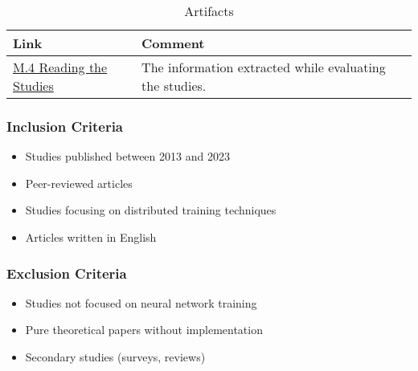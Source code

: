 



\begin{table*}[htbp]
    \centering 
    \caption{Artifacts}
    \label{tab:artefacts}
    \begin{tabularx}{\textwidth}{lXX}
        \hline
        \textbf{Link} & \textbf{Comment} \\
        \hline
        \href{https://1drv.ms/x/c/a7d18f02247e70f7/EU6EIrW0ubBBlxLX8JvVxjgBcGvPiTlZgRLTdLrM9-S4bw?e=os2ugX}{M.4 Reading the Studies} & 
        The information extracted while evaluating the studies. \\
        \hline
    \end{tabularx}
\end{table*}

\subsubsection{Inclusion Criteria}
\begin{itemize}
    \item Studies published between 2013 and 2023
    \item Peer-reviewed articles
    \item Studies focusing on distributed training techniques
    \item Articles written in English
\end{itemize}

\subsubsection{Exclusion Criteria}
\begin{itemize}
    \item Studies not focused on neural network training
    \item Pure theoretical papers without implementation
    \item Secondary studies (surveys, reviews)
\end{itemize}

